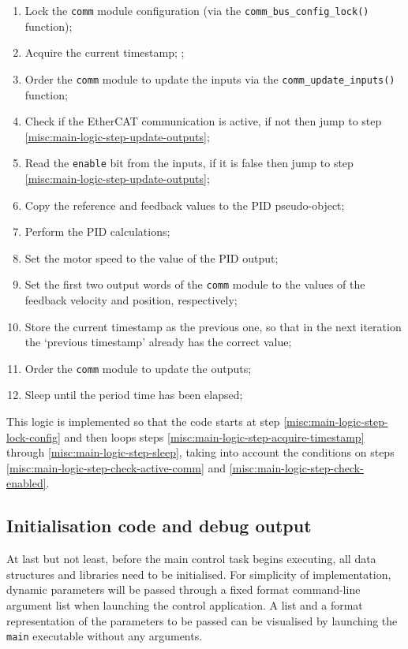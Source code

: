\begin{enumerate}
	\item Lock the \verb|comm| module configuration (via the \lstinline[columns=fixed]{comm_bus_config_lock()} function); \label{misc:main-logic-step-lock-config}
	\item Acquire the current timestamp; \label{misc:main-logic-step-acquire-timestamp};
	\item Order the \verb|comm| module to update the inputs via the \lstinline[columns=fixed]{comm_update_inputs()} function;
	\item Check if the EtherCAT communication is active, if not then jump to step \ref{misc:main-logic-step-update-outputs}; \label{misc:main-logic-step-check-active-comm}
	\item Read the \verb|enable| bit from the inputs, if it is false then jump to step \ref{misc:main-logic-step-update-outputs}; \label{misc:main-logic-step-check-enabled}
	\item Copy the reference and feedback values to the PID pseudo-object;
	\item Perform the PID calculations;
	\item Set the motor speed to the value of the PID output;
	\item Set the first two output words of the \verb|comm| module to the values of the feedback velocity and position, respectively; \label{misc:main-logic-step-update-outputs}
	\item Store the current timestamp as the previous one, so that in the next iteration the `previous timestamp' already has the correct value;
	\item Order the \verb|comm| module to update the outputs;
	\item Sleep until the period time has been elapsed; \label{misc:main-logic-step-sleep}
\end{enumerate}

This logic is implemented so that the code starts at step \ref{misc:main-logic-step-lock-config} and then loops steps \ref{misc:main-logic-step-acquire-timestamp} through \ref{misc:main-logic-step-sleep}, taking into account the conditions on steps \ref{misc:main-logic-step-check-active-comm} and \ref{misc:main-logic-step-check-enabled}.

\subsection{Initialisation code and debug output}
At last but not least, before the main control task begins executing, all data structures and libraries need to be initialised.
For simplicity of implementation, dynamic parameters will be passed through a fixed format command-line argument list when launching the control application.
A list and a format representation of the parameters to be passed can be visualised by launching the \verb|main| executable without any arguments.

